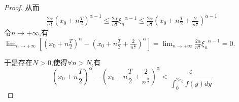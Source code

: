 \documentclass[lang=cn,newtx,10pt,scheme=chinese]{../Template/elegantbook}
\begin{document}
\begin{proof}
从而
\begin{equation}
\begin{split}
\frac{2\alpha}{n^{\frac{\alpha}{2}}}\left( x_0+n\frac{T}{2} \right) ^{\alpha -1}\leqslant \frac{2\alpha}{n^{\frac{\alpha}{2}}}{\xi _n}^{\alpha -1}\leqslant \frac{2\alpha}{n^{\frac{\alpha}{2}}}\left( x_0+n\frac{T}{2}+\frac{2}{n^{\frac{\alpha}{2}}} \right) ^{\alpha -1}
\end{split}
\nonumber
\end{equation}
令$n\rightarrow +\infty$,有$\lim_{n\rightarrow +\infty} \left[ \left( x_0+n\frac{T}{2} \right) ^{\alpha}-\left( x_0+n\frac{T}{2}+\frac{2}{n^{\frac{\alpha}{2}}} \right) ^{\alpha} \right] =\lim_{n\rightarrow +\infty} \frac{2\alpha}{n^{\frac{\alpha}{2}}}{\xi _n}^{\alpha -1}=0$.

于是存在$N>0$,使得$\forall n>N$,有
\begin{equation}\label{C}
\left( x_0+n\frac{T}{2} \right) ^{\alpha}-\left( x_0+n\frac{T}{2}+\frac{2}{n^{\frac{\alpha}{2}}} \right) ^{\alpha}<\frac{\varepsilon}{\int_0^{2x_0}{f\left( y \right) dy}}
\end{equation}


\end{proof}
\end{document}
